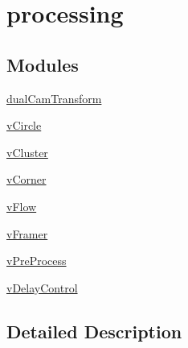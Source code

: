 \hypertarget{group__processing}{}\section{processing}
\label{group__processing}
\subsection*{Modules}
\begin{DoxyCompactItemize}
\item 
\hyperlink{group__dualCamTransform}{dual\+Cam\+Transform}
\item 
\hyperlink{group__vCircle}{v\+Circle}
\item 
\hyperlink{group__vCluster}{v\+Cluster}
\item 
\hyperlink{group__vCorner}{v\+Corner}
\item 
\hyperlink{group__vFlow}{v\+Flow}
\item 
\hyperlink{group__vFramer}{v\+Framer}
\item 
\hyperlink{group__vPreProcess}{v\+Pre\+Process}
\item 
\hyperlink{group__vDelayControl}{v\+Delay\+Control}
\end{DoxyCompactItemize}


\subsection{Detailed Description}
